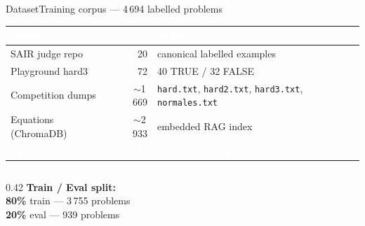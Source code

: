 \documentclass[aspectratio=169,10pt]{beamer}
\begin{document}
\begin{frame}{Dataset}{Training corpus — 4\,694 labelled problems}
\vspace{3mm}

\setlength\arrayrulewidth{0.3pt}
\begin{tabular}{p{3.8cm}rp{5.4cm}}
  \toprule
  \rowcolor{BannerDark}
  \textcolor{white}{\textbf{Source}} &
  \textcolor{white}{\textbf{\#}} &
  \textcolor{white}{\textbf{Notes}} \\
  \midrule
  \rowcolor{BoxBg}
  SAIR judge repo       & 20           & canonical labelled examples \\
  Playground hard3      & 72           & 40 TRUE / 32 FALSE \\
  \rowcolor{BoxBg}
  Competition dumps     & $\sim$1\,669 & \texttt{hard.txt}, \texttt{hard2.txt}, \texttt{hard3.txt}, \texttt{normales.txt} \\
  Equations (ChromaDB)  & $\sim$2\,933 & embedded RAG index \\
  \midrule
  \rowcolor{BannerDark}
  \textcolor{white}{\textbf{Total}} &
  \textcolor{white}{\textbf{4\,694}} &
  \textcolor{white}{deterministic split, seed 0} \\
  \bottomrule
\end{tabular}

\vspace{5mm}

\begin{columns}[T,onlytextwidth]
  \begin{column}{0.42\textwidth}
    \textbf{Train / Eval split:}\\[4pt]
    \textcolor{AccentBlue}{\textbf{80\%}} train — 3\,755 problems\\[2pt]
    \textcolor{AccentRed}{\textbf{20\%}} eval \phantom{0}— 939 problems


\end{column}
\end{columns}
\end{frame}
\end{document}
